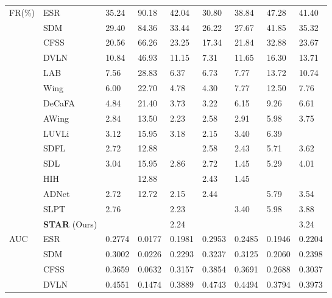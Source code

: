 \documentclass[10pt,twocolumn,letterpaper]{article}
\begin{document}
\begin{table}[h]
\begin{tabular}{m{1.7cm}<{\centering}|m{2.6cm}<{\centering}|m{1.2cm}<{\centering}|m{1.2cm}<{\centering}|m{1.4cm}<{\centering}|m{1.6cm}<{\centering}|m{1.3cm}<{\centering}|m{1.3cm}<{\centering}|m{1.2cm}<{\centering}}
\hline
\multirow{15}{*}{FR(\%)}
& ESR \cite{cao2014face} & 35.24 & 90.18 & 42.04 & 30.80 & 38.84 & 47.28 & 41.40 \\
& SDM \cite{xiong2013supervised} & 29.40 & 84.36 & 33.44 & 26.22 & 27.67 & 41.85 & 35.32 \\
& CFSS \cite{zhu2015face} & 20.56 & 66.26 & 23.25 & 17.34 & 21.84 & 32.88 & 23.67 \\
& DVLN \cite{wu2017leveraging} & 10.84 & 46.93 & 11.15 & 7.31 & 11.65 & 16.30 & 13.71 \\
& LAB \cite{wu2018lab} & 7.56 & 28.83 & 6.37 & 6.73 & 7.77 & 13.72 & 10.74 \\
& Wing \cite{feng2018wing} & 6.00 & 22.70 & 4.78 & 4.30 & 7.77 & 12.50 & 7.76 \\
& DeCaFA \cite{dapogny2019decafa} & 4.84 & 21.40 & 3.73 & 3.22 & 6.15 & 9.26 & 6.61 \\
& AWing \cite{wang2019awing} & 2.84 & 13.50 & 2.23 & 2.58 & 2.91 & 5.98 & 3.75 \\
& LUVLi \cite{kumar2020luvli} & 3.12 & 15.95 & 3.18 & 2.15 & 3.40 & 6.39 & \color{blue}{3.23} \\
& SDFL \cite{lin2021structure} & 2.72 & 12.88 & \color{blue}{1.59} & 2.58 & 2.43 & 5.71 & 3.62 \\ 
& SDL \cite{li2020structured} & 3.04 & 15.95 & 2.86 & 2.72 & 1.45 & 5.29 & 4.01 \\
& HIH \cite{lan2021hih} & \color{blue}{2.60} & 12.88 & \color{red}{1.27} & 2.43 & 1.45 & \color{blue}{5.16} & \color{red}{3.10} \\
& ADNet \cite{huang2021adnet} & 2.72 & 12.72 & 2.15 & 2.44 & \color{blue}{1.94} & 5.79 & 3.54 \\
& SLPT\cite{SLPT} & 2.76 & \color{blue}{12.27} & 2.23 & \color{blue}{1.86} & 3.40 & 5.98 & 3.88 \\
\cline{2-9}
& \textbf{STAR} (Ours) & \color{red}{\textbf{2.32}} & \color{red}{\textbf{11.69}} & 2.24 & \color{red}{\textbf{1.58}} & \color{red}{\textbf{0.98}} & \color{red}{\textbf{4.76}} & 3.24 \\
\hline
\multirow{14}{*}{AUC }
& ESR \cite{cao2014face} & 0.2774 & 0.0177 & 0.1981 & 0.2953 & 0.2485 & 0.1946 & 0.2204 \\
& SDM \cite{xiong2013supervised} & 0.3002 & 0.0226 & 0.2293 & 0.3237 & 0.3125 & 0.2060 & 0.2398 \\
& CFSS \cite{zhu2015face} & 0.3659 & 0.0632 & 0.3157 & 0.3854 & 0.3691 & 0.2688 & 0.3037 \\
& DVLN \cite{wu2017leveraging} & 0.4551 & 0.1474 & 0.3889 & 0.4743 & 0.4494 & 0.3794 & 0.3973 \\

\end{tabular}
\end{table}
\end{document}
